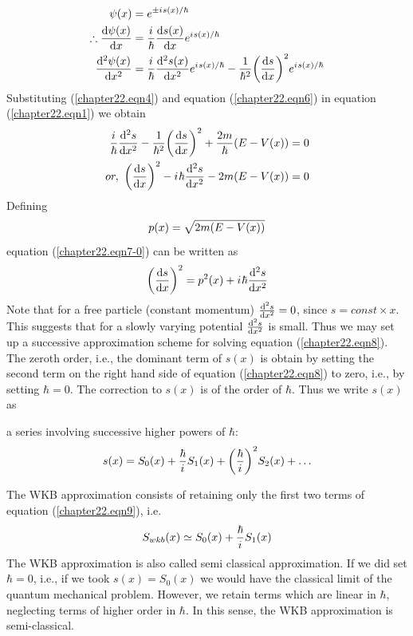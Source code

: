 \begin{align}
\label{chapter22.eqn4}
\psi\qty(x) &= e^{\pm {i\mkern1mu} s(x) / \hbar}
\\
\label{chapter22.eqn5}
\therefore \dv{\psi(x)}{x} &= \frac{{i\mkern1mu}}{\hbar} \dv{s(x)}{x} e^{{i\mkern1mu} s(x)/\hbar}\\
\label{chapter22.eqn6}
\dv[2]{\psi(x)}{x} &= \frac{{i\mkern1mu}}{\hbar} \dv[2]{s(x)}{x} e^{{i\mkern1mu} s(x)/\hbar} - \frac{1}{\hbar^2} \qty(\dv{s}{x})^2 e^{{i\mkern1mu} s(x)/\hbar}
\end{align}
Substituting (\ref{chapter22.eqn4}) and equation (\ref{chapter22.eqn6}) in equation (\ref{chapter22.eqn1}) we obtain
\begin{align}
	\frac{{i\mkern1mu}}{\hbar} \dv[2]{s}{x} - \frac{1}{\hbar^2} \qty(\dv{s}{x})^2 + \frac{2 m}{\hbar} \qty(E - V(x)) &= 0  \nonumber\\
	\label{chapter22.eqn7-0}
	or, \ \qty(\dv{s}{x})^2 - {i\mkern1mu} \hbar \dv[2]{s}{x} - 2 m \qty(E - V(x)) &= 0
\end{align}
Defining
\begin{equation}
\label{chapter22.eqn7}
p(x) = \sqrt{2 m \qty(E - V(x))}
\end{equation}
equation (\ref{chapter22.eqn7-0}) can be written as
\begin{equation}
\qty(\dv{s}{x})^2 = p^2\qty(x) + {i\mkern1mu} \hbar \dv[2]{s}{x}
\label{chapter22.eqn8}
\end{equation}
Note that for a free particle (constant momentum) $\dv[2]{s}{x} = 0$, since $s=const \times x$. This suggests that for a slowly varying potential $\dv[2]{s}{x}$ is small. Thus we may set up a successive approximation scheme for solving equation (\ref{chapter22.eqn8}). The zeroth order, i.e., the dominant term of $s(x)$ is obtain by setting the second term on the right hand side of equation (\ref{chapter22.eqn8}) to zero, i.e., by setting $\hbar=0$. The correction to $s(x)$ is of the order of $\hbar$. Thus we write $s(x)$ as

a series involving successive higher powers of $\hbar$:
\begin{equation}
\label{chapter22.eqn9}
	s(x) = S_0(x) + \frac{\hbar}{{i\mkern1mu}} S_1(x) + \qty(\frac{\hbar}{{i\mkern1mu}})^{2} S_2(x) + \ldots
\end{equation}

The WKB approximation consists of retaining only the first two terms of equation (\ref{chapter22.eqn9}), i.e.
\begin{equation}
\label{chapter22.eqn10}
S_{wkb}(x) \simeq S_0(x) + \frac{\hbar}{{i\mkern1mu}} S_1(x)
\end{equation}
The WKB approximation is also called semi classical approximation. If we did set $\hbar=0$, i.e., if we took $s(x) = S_0(x)$ we would have the classical limit of the quantum mechanical problem. However, we retain terms which are linear in $\hbar$, neglecting terms of higher order in $\hbar$. In this sense, the WKB approximation is semi-classical.


